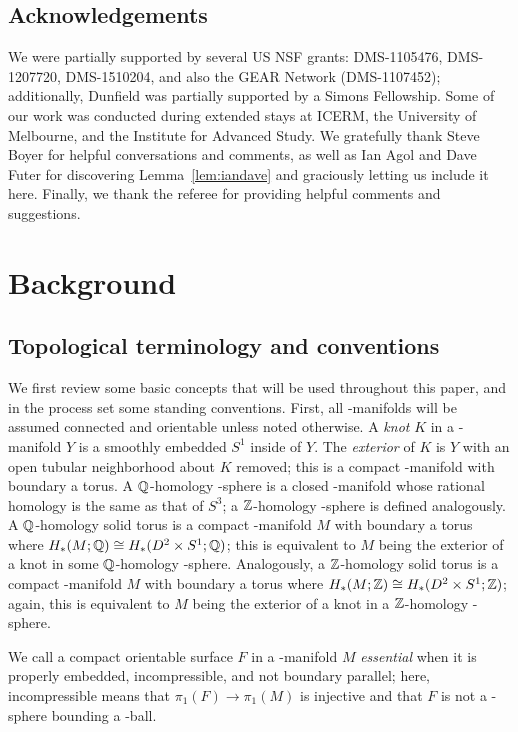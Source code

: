 \documentclass[tikz, sepfignums, defaultenums]{nmd/article}
\begin{document}
\subsection{Acknowledgements} 

We were partially supported by several US NSF grants: DMS-1105476,
DMS-1207720, DMS-1510204, and also the GEAR Network (DMS-1107452);
additionally, Dunfield was partially supported by a Simons
Fellowship. Some of our work was conducted during extended stays at
ICERM, the University of Melbourne, and the Institute for Advanced
Study.  We gratefully thank Steve Boyer for helpful conversations and
comments, as well as Ian Agol and Dave Futer for discovering
Lemma~\ref{lem:iandave} and graciously letting us include it here.
Finally, we thank the referee for providing helpful comments and
suggestions.


\section{Background}
\label{sec:background}

\subsection{Topological terminology and conventions} 

We first review some basic concepts that will be used throughout this
paper, and in the process set some standing conventions.  First, all
\3-manifolds will be assumed connected and orientable unless noted
otherwise.  A \emph{knot} $K$ in a \3-manifold $Y$ is a smoothly
embedded $S^1$ inside of $Y$.  The \emph{exterior} of $K$ is $Y$ with
an open tubular neighborhood about $K$ removed; this is a compact
\3-manifold with boundary a torus.  A ${\mathbb Q}$-homology \3-sphere is a
closed \3-manifold whose rational homology is the same as that of
$S^3$; a ${\mathbb Z}$-homology \3-sphere is defined analogously.  A
${\mathbb Q}$-homology solid torus is a compact \3-manifold $M$ with boundary a
torus where $H_*(M; {\mathbb Q}) \cong H_*(D^2 \times S^1; {\mathbb Q})$; this is
equivalent to $M$ being the exterior of a knot in some ${\mathbb Q}$-homology
\3-sphere.  Analogously, a ${\mathbb Z}$-homology solid torus is a compact
\3-manifold $M$ with boundary a torus where
$H_*(M; {\mathbb Z}) \cong H_*(D^2 \times S^1; {\mathbb Z})$; again, this is equivalent
to $M$ being the exterior of a knot in a ${\mathbb Z}$-homology \3-sphere.

We call a compact orientable surface $F$ in a \3-manifold $M$
\emph{essential} when it is properly embedded, incompressible, and not
boundary parallel; here, incompressible means that
$\pi_1(F) \to \pi_1(M)$ is injective and that $F$ is not a \2-sphere
bounding a \3-ball.
\end{document}
